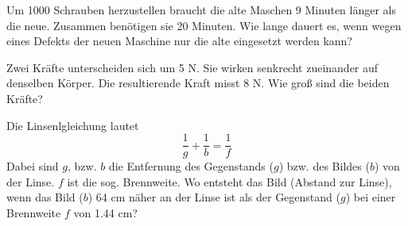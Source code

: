 \begin{bbwAufgabenBlock}

\item Um 1000 Schrauben herzustellen braucht die alte Maschen 9
Minuten länger als die neue. Zusammen benötigen sie 20 Minuten. Wie
lange dauert es, wenn wegen eines Defekts der neuen Maschine nur die
alte eingesetzt werden kann?


\item  Zwei Kräfte unterscheiden sich um 5 N. Sie wirken senkrecht
zueinander auf denselben Körper. Die resultierende Kraft misst 8
N. Wie groß sind die beiden Kräfte?


\item Die Linsenlgleichung lautet
$$\frac1g + \frac1b = \frac1f$$
Dabei sind $g$, bzw. $b$ die Entfernung des Gegenstands ($g$) bzw. des
Bildes ($b$) von der  Linse. $f$ ist die sog. Brennweite.
Wo entsteht das Bild (Abstand zur Linse), wenn das Bild  ($b$)  64 cm 
näher an der Linse ist als der Gegenstand ($g$) bei einer Brennweite
$f$ von 1.44 cm?


\end{bbwAufgabenBlock}
\newpage



